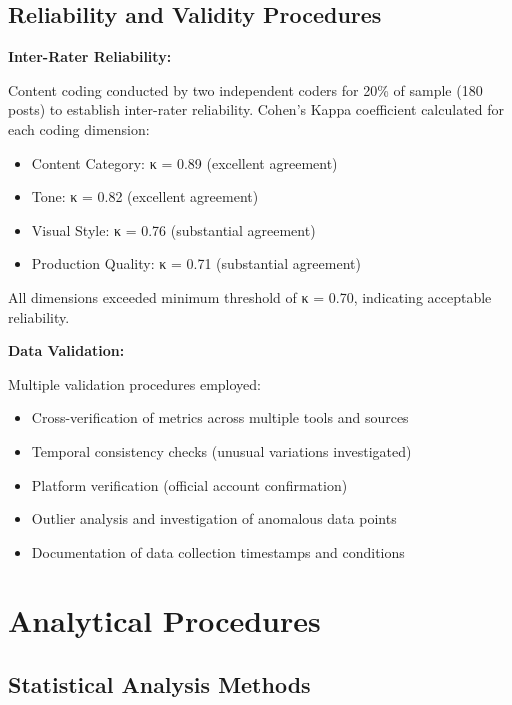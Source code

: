 \documentclass[12pt]{report}
\begin{document}
\subsection{Reliability and Validity Procedures}

\textbf{Inter-Rater Reliability:}

Content coding conducted by two independent coders for 20\% of sample (180 posts) to establish inter-rater reliability. Cohen's Kappa coefficient calculated for each coding dimension:

\begin{itemize}
\item Content Category: κ = 0.89 (excellent agreement)
\item Tone: κ = 0.82 (excellent agreement)
\item Visual Style: κ = 0.76 (substantial agreement)
\item Production Quality: κ = 0.71 (substantial agreement)
\end{itemize}

All dimensions exceeded minimum threshold of κ = 0.70, indicating acceptable reliability.

\textbf{Data Validation:}

Multiple validation procedures employed:

\begin{itemize}
\item Cross-verification of metrics across multiple tools and sources
\item Temporal consistency checks (unusual variations investigated)
\item Platform verification (official account confirmation)
\item Outlier analysis and investigation of anomalous data points
\item Documentation of data collection timestamps and conditions
\end{itemize}

\section{Analytical Procedures}

\subsection{Statistical Analysis Methods}
\end{document}
